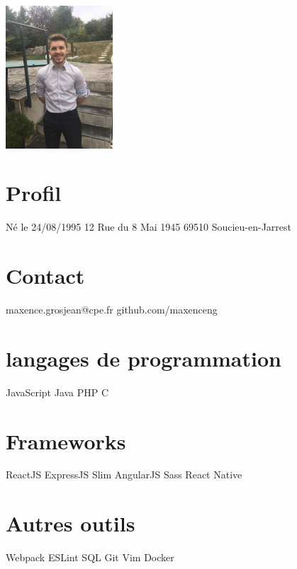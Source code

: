\documentclass[french]{cv-style}          %
\begin{document}
\lastupdated


\begin{aside}
\includegraphics[width=4cm]{photo}
\section{Profil}
Né le 24/08/1995
12 Rue du 8 Mai 1945
69510 Soucieu-en-Jarrest
%
\section{Contact}
maxence.grosjean@cpe.fr \faEnvelope
github.com/maxenceng  \faPhone
%
\section{langages de programmation}
{\color{yellow} \faStar} JavaScript \faJs
Java \faJava
PHP \faPhp
C
%
\section{Frameworks}
{\color{yellow} \faStar} ReactJS
ExpressJS
Slim
AngularJS
Sass
React Native
%
\section{Autres outils}
Webpack
ESLint
SQL
Git
Vim
Docker
%
\end{aside}

\end{document}
